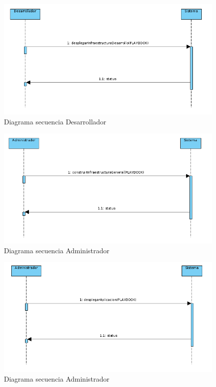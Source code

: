 		\begin{figure}[!hbt]
			\centering
			\includegraphics[scale=0.4]{imagenes/Analisis/diagrama_secuencia_desarrollador_3.png}
			\caption[Diagrama secuencia Desarrollador]{Diagrama secuencia Desarrollador \cite{diagramasecuencia:online}} 
			\label{Diagrama secuencia}
		\end{figure}
	
		\begin{figure}[!hbt]
			\centering
			\includegraphics[scale=0.4]{imagenes/Analisis/diagrama_secuencia_administrador_1.png}
			\caption[Diagrama secuencia Desarrollador]{Diagrama secuencia Administrador \cite{diagramasecuencia:online}}
			\label{Diagrama secuencia}
		\end{figure}
		\clearpage
		
		\begin{figure}[!hbt]
			\centering
			\includegraphics[scale=0.4]{imagenes/Analisis/diagrama_secuencia_administrador_2.png}
			\caption[Diagrama secuencia Desarrollador]{Diagrama secuencia Administrador \cite{diagramasecuencia:online}}
			\label{Diagrama secuencia}
		\end{figure}
	
